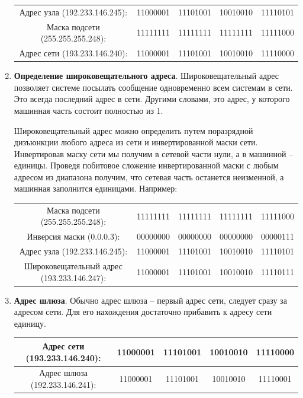 \documentclass[a4paper]{article}
\begin{document}
\begin{enumerate}
		
				\begin{tabular}{|c|cccc|}
				\hline
					Адрес узла (192.233.146.245): & 11000001 & 11101001 & 10010010 & 11110101\\
					Маска подсети (255.255.255.248): & 11111111 & 11111111 & 11111111 & 11111000\\
				\hline
					Адрес сети (193.233.146.240): & 11000001 & 11101001 & 10010010 & 11110000\\
				\hline
				\end{tabular}
				\item
					\textbf{Определение широковещательного адреса}. Широковещательный адрес позволяет системе посылать сообщение одновременно всем системам в сети. Это всегда последний адрес в сети. Другими словами, это адрес, у которого машинная часть состоит полностью из 1.

				Широковещательный адрес можно определить путем поразрядной дизъюнкции любого адреса из сети и инвертированной маски сети. Инвертировав маску сети мы получим в сетевой части нули, а в машинной -- единицы. Проведя побитовое сложение инвертированной маски с любым адресом из диапазона получим, что сетевая часть останется неизменной, а машинная заполнится единицами. Например:

			\begin{tabular}{|c|cccc|}
			\hline
				Маска подсети (255.255.255.248): & 11111111 & 11111111 & 11111111 & 11111000\\
			Инверсия маски (0.0.0.3): & 00000000 & 00000000 & 00000000 & 00000111\\
				Адрес узла (192.233.146.245): & 11000001 & 11101001 & 10010010 & 11110101\\
			\hline
				Широковещательный адрес (193.233.146.247): & 11000001 & 11101001 & 10010010 & 11110111\\
			\hline
			\end{tabular}


			\item
				\textbf{Адрес шлюза}. Обычно адрес шлюза -- первый адрес сети, следует сразу за адресом сети. Для его нахождения достаточно прибавить к адресу сети единицу.

				\begin{tabular}{|c|cccc|}
				\hline
					Адрес сети (193.233.146.240): & 11000001 & 11101001 & 10010010 & 11110000\\
				\hline
					Адрес шлюза (192.233.146.241): & 11000001 & 11101001 & 10010010 & 11110001\\
				\hline
				\end{tabular}
		\end{enumerate}
		
\end{document}
